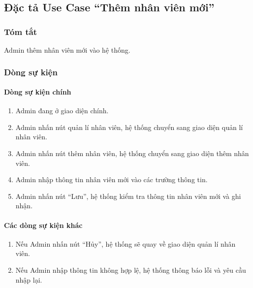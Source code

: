 \subsection{Đặc tả Use Case ``Thêm nhân viên mới''}

\subsubsection{Tóm tắt}
Admin thêm nhân viên mới vào hệ thống.

\subsubsection{Dòng sự kiện}
\paragraph{\textbf{Dòng sự kiện chính}}
\begin{enumerate}
  \item Admin đang ở giao diện chính.
  \item Admin nhấn nút quản lí nhân viên, hệ thống chuyển sang giao diện quản lí nhân viên.
  \item Admin nhấn nút thêm nhân viên, hệ thống chuyển sang giao diện thêm nhân viên.
  \item Admin nhập thông tin nhân viên mới vào các trường thông tin.
  \item Admin nhấn nút ``Lưu'', hệ thống kiểm tra thông tin nhân viên mới và ghi nhận.
\end{enumerate}

\paragraph{\textbf{Các dòng sự kiện khác}}
\begin{enumerate}
  \item Nếu Admin nhấn nút ``Hủy'', hệ thống sẽ quay về giao diện quản lí nhân viên.
  \item Nếu Admin nhập thông tin không hợp lệ, hệ thống thông báo lỗi và yêu cầu nhập lại.
\end{enumerate}

